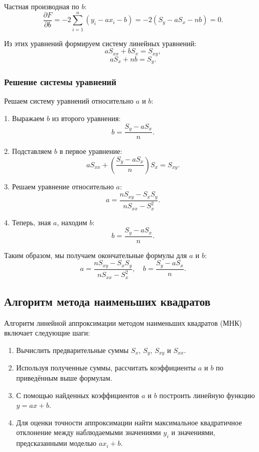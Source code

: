 Частная производная по $b$:
\[
\frac{\partial F}{\partial b} = -2 \sum_{i=1}^{n} (y_i - ax_i - b) = -2(S_y - aS_x - nb) = 0.
\]

Из этих уравнений формируем систему линейных уравнений:
\[
aS_{xx} + bS_x = S_{xy},
\]
\[
aS_x + nb = S_y.
\]

\subsubsection{Решение системы уравнений}
Решаем систему уравнений относительно $a$ и $b$:

1. Выражаем $b$ из второго уравнения:
\[
b = \frac{S_y - aS_x}{n}.
\]

2. Подставляем $b$ в первое уравнение:
\[
aS_{xx} + \left(\frac{S_y - aS_x}{n}\right)S_x = S_{xy}.
\]

3. Решаем уравнение относительно $a$:
\[
a = \frac{nS_{xy} - S_xS_y}{nS_{xx} - S_x^2}.
\]

4. Теперь, зная $a$, находим $b$:
\[
b = \frac{S_y - aS_x}{n}.
\]

Таким образом, мы получаем окончательные формулы для $a$ и $b$:
\[
a = \frac{nS_{xy} - S_xS_y}{nS_{xx} - S_x^2}, \quad b = \frac{S_y - aS_x}{n}.
\]

\subsection{Алгоритм метода наименьших квадратов}
Алгоритм линейной аппроксимации методом наименьших квадратов (МНК) включает следующие шаги:
\begin{enumerate}
  \item Вычислить предварительные суммы $S_x$, $S_y$, $S_{xy}$ и $S_{xx}$.
  \item Используя полученные суммы, рассчитать коэффициенты $a$ и $b$ по приведённым выше формулам.
  \item С помощью найденных коэффициентов $a$ и $b$ построить линейную функцию $y = ax + b$.
  \item Для оценки точности аппроксимации найти максимальное квадратичное отклонение между наблюдаемыми значениями $y_i$ и значениями, предсказанными моделью $ax_i + b$.
\end{enumerate}